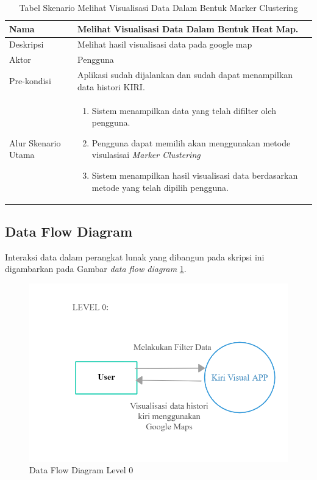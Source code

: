 \begin{table}[H]
    \centering
    \caption{Tabel Skenario Melihat Visualisasi Data Dalam Bentuk Marker Clustering }
    \begin{tabular}{|p{3cm}|p{10cm}|}
    \hline
        Nama & Melihat Visualisasi Data Dalam Bentuk Heat Map.\\
    \hline
    \hline
        Deskripsi & Melihat hasil visualisasi data pada google map  \\
    \hline
        Aktor & Pengguna \\
    \hline
        Pre-kondisi & Aplikasi sudah dijalankan dan sudah dapat menampilkan data histori KIRI.\\
    \hline
        Alur Skenario Utama & 
        \begin{enumerate}
            \item Sistem menampilkan data yang telah difilter oleh pengguna.
             \item Pengguna  dapat memilih akan menggunakan metode visulasisai \textit{Marker Clustering} 
            \item Sistem menampilkan hasil visualisasi data berdasarkan metode yang telah dipilih pengguna.
        \end{enumerate}\\
    \hline
    \end{tabular}
    \label{tab:skenario1}
\end{table}

\subsection{Data Flow Diagram}
Interaksi data dalam perangkat lunak yang dibangun pada skripsi ini digambarkan pada Gambar \textit{data flow diagram} \ref{fig:dfd_0}.
\begin{figure}[H]
	\centering  
	\includegraphics[scale=0.4]{Gambar/DFD_0.png}  
	\caption[Data Flow Diagram Level 0]{Data Flow Diagram Level 0} 
	\label{fig:dfd_0} 
\end{figure} 

